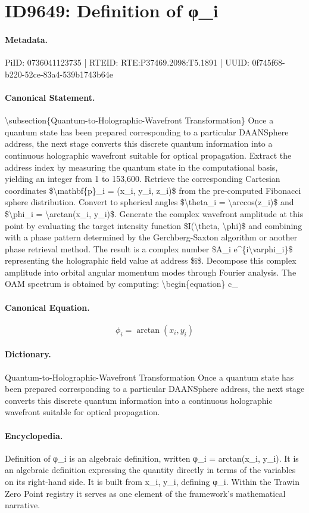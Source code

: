 \section*{ID9649: Definition of φ\_i}
\paragraph{Metadata.}
PiID: 0736041123735 | RTEID: RTE:P37469.2098:T5.1891 | UUID: 0f745f68-b220-52ce-83a4-539b1743b64e

\paragraph{Canonical Statement.}
\textbackslash{}subsection\{Quantum-to-Holographic-Wavefront Transformation\} Once a quantum state has been prepared corresponding to a particular DAANSphere address, the next stage converts this discrete quantum information into a continuous holographic wavefront suitable for optical propagation. Extract the address index by measuring the quantum state in the computational basis, yielding an integer from 1 to 153,600. Retrieve the corresponding Cartesian coordinates \$\textbackslash{}mathbf\{p\}\_i = (x\_i, y\_i, z\_i)\$ from the pre-computed Fibonacci sphere distribution. Convert to spherical angles \$\textbackslash{}theta\_i = \textbackslash{}arccos(z\_i)\$ and \$\textbackslash{}phi\_i = \textbackslash{}arctan(x\_i, y\_i)\$. Generate the complex wavefront amplitude at this point by evaluating the target intensity function \$I(\textbackslash{}theta, \textbackslash{}phi)\$ and combining with a phase pattern determined by the Gerchberg-Saxton algorithm or another phase retrieval method. The result is a complex number \$A\_i e\textasciicircum{}\{i\textbackslash{}varphi\_i\}\$ representing the holographic field value at address \$i\$. Decompose this complex amplitude into orbital angular momentum modes through Fourier analysis. The OAM spectrum is obtained by computing: \textbackslash{}begin\{equation\} c\_

\paragraph{Canonical Equation.}
\[
\phi_i = \arctan(x_i, y_i)
\]

\paragraph{Dictionary.}
Quantum-to-Holographic-Wavefront Transformation Once a quantum state has been prepared corresponding to a particular DAANSphere address, the next stage converts this discrete quantum information into a continuous holographic wavefront suitable for optical propagation.

\paragraph{Encyclopedia.}
Definition of φ\_i is an algebraic definition, written φ\_i = arctan(x\_i, y\_i). It is an algebraic definition expressing the quantity directly in terms of the variables on its right-hand side. It is built from x\_i, y\_i, defining φ\_i. Within the Trawin Zero Point registry it serves as one element of the framework's mathematical narrative.
